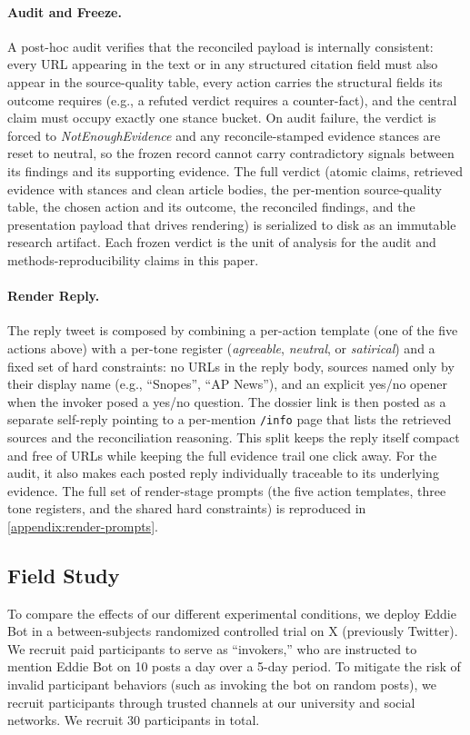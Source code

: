 \paragraph{Audit and Freeze.} A post-hoc audit verifies that the reconciled payload is internally consistent: every URL appearing in the text or in any structured citation field must also appear in the source-quality table, every action carries the structural fields its outcome requires (e.g., a refuted verdict requires a counter-fact), and the central claim must occupy exactly one stance bucket. On audit failure, the verdict is forced to \textit{NotEnoughEvidence} and any reconcile-stamped evidence stances are reset to neutral, so the frozen record cannot carry contradictory signals between its findings and its supporting evidence. The full verdict (atomic claims, retrieved evidence with stances and clean article bodies, the per-mention source-quality table, the chosen action and its outcome, the reconciled findings, and the presentation payload that drives rendering) is serialized to disk as an immutable research artifact. Each frozen verdict is the unit of analysis for the audit and methods-reproducibility claims in this paper.

\paragraph{Render Reply.} The reply tweet is composed by combining a per-action template (one of the five actions above) with a per-tone register (\textit{agreeable}, \textit{neutral}, or \textit{satirical}) and a fixed set of hard constraints: no URLs in the reply body, sources named only by their display name (e.g., ``Snopes'', ``AP News''), and an explicit yes/no opener when the invoker posed a yes/no question. The dossier link is then posted as a separate self-reply pointing to a per-mention \texttt{/info} page that lists the retrieved sources and the reconciliation reasoning. This split keeps the reply itself compact and free of URLs while keeping the full evidence trail one click away. For the audit, it also makes each posted reply individually traceable to its underlying evidence. The full set of render-stage prompts (the five action templates, three tone registers, and the shared hard constraints) is reproduced in \autoref{appendix:render-prompts}.

\subsection{Field Study}\label{sec:field-study}
To compare the effects of our different experimental conditions, we deploy Eddie Bot in a between-subjects randomized controlled trial on X (previously Twitter). We recruit paid participants to serve as ``invokers,'' who are instructed to mention Eddie Bot on 10 posts a day over a 5-day period. To mitigate the risk of invalid participant behaviors (such as invoking the bot on random posts), we recruit participants through trusted channels at our university and social networks. We recruit 30 participants in total.

